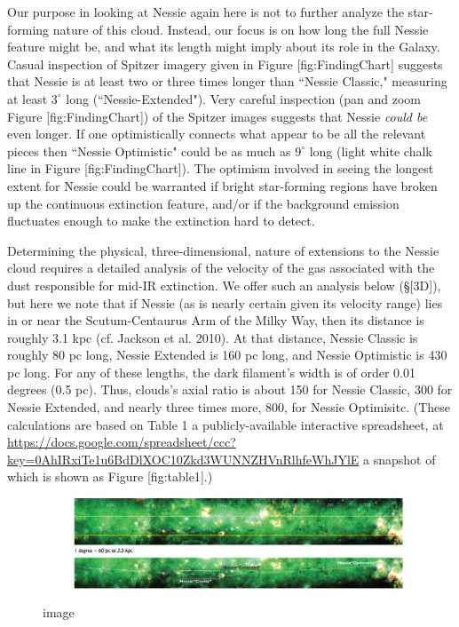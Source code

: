 \documentclass[]{article}
\makeatletter
\def\maxwidth{\ifdim\Gin@nat@width>\linewidth\linewidth
\else\Gin@nat@width\fi}
\let\Oldincludegraphics\includegraphics
\renewcommand{\includegraphics}[1]{\Oldincludegraphics[width=\maxwidth]{#1}}
\makeatother
\begin{document}
Our purpose in looking at Nessie again here is not to further analyze
the star-forming nature of this cloud. Instead, our focus is on how long
the full Nessie feature might be, and what its length might imply about
its role in the Galaxy. Casual inspection of Spitzer imagery given in
Figure {[}fig:FindingChart{]} suggests that Nessie is at least two or
three times longer than ``Nessie Classic," measuring at least $3^\circ$
long (``Nessie-Extended"). Very careful inspection (pan and zoom Figure
{[}fig:FindingChart{]}) of the Spitzer images suggests that Nessie
\emph{could be} even longer. If one optimistically connects what appear
to be all the relevant pieces then ``Nessie Optimistic" could be as much
as $9^\circ$ long (light white chalk line in Figure
{[}fig:FindingChart{]}). The optimism involved in seeing the longest
extent for Nessie could be warranted if bright star-forming regions have
broken up the continuous extinction feature, and/or if the background
emission fluctuates enough to make the extinction hard to detect.

Determining the physical, three-dimensional, nature of extensions to the
Nessie cloud requires a detailed analysis of the velocity of the gas
associated with the dust responsible for mid-IR extinction. We offer
such an analysis below (§{[}3D{]}), but here we note that if Nessie (as
is nearly certain given its velocity range) lies in or near the
Scutum-Centaurus Arm of the Milky Way, then its distance is roughly 3.1
kpc (cf. Jackson et al. 2010). At that distance, Nessie Classic is
roughly 80 pc long, Nessie Extended is 160 pc long, and Nessie
Optimistic is 430 pc long. For any of these lengths, the dark filament's
width is of order 0.01 degrees (0.5 pc). Thus, clouds's axial ratio is
about 150 for Nessie Classic, 300 for Nessie Extended, and nearly three
times more, 800, for Nessie Optimisitc. (These calculations are based on
Table 1 a publicly-available interactive spreadsheet, at
\url{https://docs.google.com/spreadsheet/ccc?key=0AhIRxiTe1u6BdDlXOC10Zkd3WUNNZHVnRlhfeWhJYlE}
a snapshot of which is shown as Figure {[}fig:table1{]}.)

\begin{figure}[htbp]
\centering
\includegraphics{figures/1nessie_findingchart/1nessie_findingchart.png}
\caption{image}
\end{figure}
\end{document}
